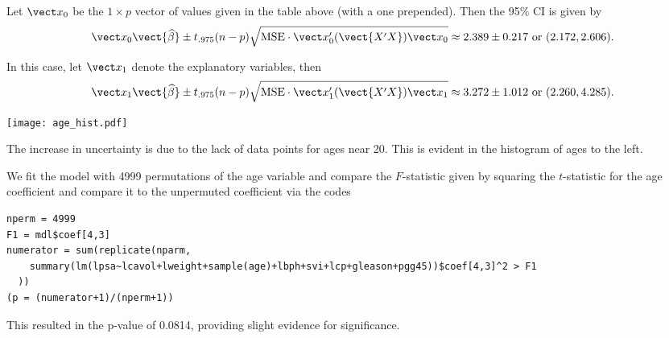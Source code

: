 \documentclass{homework}
\begin{document}

Let $\vect x_0$ be the $1\times p$ vector of values given in the table above (with a one prepended). Then the 95\% CI is given by 
$$
  \vect x_0 \vect{\hat \beta} \pm t_{.975}(n-p)\sqrt{\MSE\cdot\vect x_0'(\vect{X'X})\vect x_0} \approx 2.389\pm 0.217
\text{ or }
( 2.172, 2.606 ). $$


In this case, let $\vect x_1$ denote the explanatory variables, then
$$
  \vect x_1 \vect{\hat \beta} \pm t_{.975}(n-p)\sqrt{\MSE\cdot\vect x_1'(\vect{X'X})\vect x_1} \approx 3.272 \pm 1.012
\text{ or }
( 2.260, 4.285 ). $$


\begin{minipage}{.3\textwidth}
\texttt{[image: age\_hist.pdf]}
\end{minipage}
\begin{minipage}{.7\textwidth}
The increase in uncertainty is due to the lack of data points for ages near 20.  This is evident in the histogram of ages to the left.
\end{minipage}


We fit the model with 4999 permutations of the age variable and compare the $F$-statistic given by squaring the $t$-statistic for the age coefficient and compare it to the unpermuted coefficient via the codes
{\small
\begin{verbatim}
nperm = 4999
F1 = mdl$coef[4,3]
numerator = sum(replicate(nparm, 
    summary(lm(lpsa~lcavol+lweight+sample(age)+lbph+svi+lcp+gleason+pgg45))$coef[4,3]^2 > F1
  ))
(p = (numerator+1)/(nperm+1)) 
\end{verbatim}
}
This resulted in the p-value of 0.0814, providing slight evidence for significance.
\end{document}
